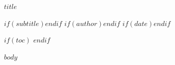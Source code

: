 \documentclass[14pt]{extreport}
\begin{document}
\begin{center}
{\LARGE\bfseries $title$\par}
$if(subtitle)$\vspace{0.4em}{\large $subtitle$\par}$endif$
$if(author)$\vspace{1em}{$for(author)$$author$$sep$ \\ $endfor$\par}$endif$
$if(date)$\vspace{0.5em}{$date$\par}$endif$
\end{center}

\vspace{1em}

$if(toc)$
\tableofcontents
\newpage
$endif$

$body$
\end{document}
